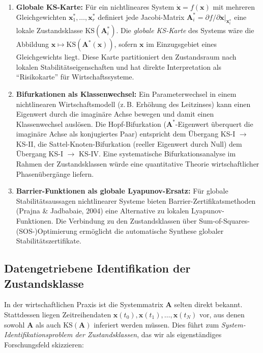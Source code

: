 \documentclass[a4paper, 12pt, twoside, openright]{report}
\theoremstyle{definition}
\theoremstyle{definition}
\newcommand{\vx}{\bm{x}}
\newcommand{\vA}{\bm{A}}
\newcommand{\KS}{\mathrm{KS}}
\begin{document}
\begin{enumerate}[label=\textbf{A\arabic*.}]
  \item \textbf{Globale KS-Karte:} Für ein nichtlineares System $\dot{\vx} = f(\vx)$
    mit mehreren Gleichgewichten $\vx_1^*, \ldots, \vx_r^*$ definiert jede
    Jacobi-Matrix $\vA_i^* = \partial f/\partial\vx|_{\vx_i^*}$ eine lokale
    Zustandsklasse $\KS(\vA_i^*)$. Die \emph{globale KS-Karte} des Systems wäre
    die Abbildung $\vx \mapsto \KS(\vA^*(\vx))$, sofern $\vx$ im Einzugsgebiet
    eines Gleichgewichts liegt. Diese Karte partitioniert den Zustandsraum nach
    lokalen Stabilitätseigenschaften und hat direkte Interpretation als ``Risikokarte''
    für Wirtschaftssysteme.

  \item \textbf{Bifurkationen als Klassenwechsel:} Ein Parameterwechsel in einem
    nichtlinearen Wirtschaftsmodell (z.\,B. Erhöhung des Leitzinses) kann einen
    Eigenwert durch die imaginäre Achse bewegen und damit einen Klassenwechsel
    auslösen. Die Hopf-Bifurkation ($\vA^*$-Eigenwert überquert die imaginäre Achse
    als konjugiertes Paar) entspricht dem Übergang KS-I $\to$ KS-II, die
    Sattel-Knoten-Bifurkation (reeller Eigenwert durch Null) dem Übergang KS-I $\to$ KS-IV.
    Eine systematische Bifurkationsanalyse im Rahmen der Zustandsklassen würde eine
    quantitative Theorie wirtschaftlicher Phasenübergänge liefern.

  \item \textbf{Barrier-Funktionen als globale Lyapunov-Ersatz:} Für globale
    Stabilitätsaussagen nichtlinearer Systeme bieten Barrier-Zertifikatsmethoden
    (Prajna \& Jadbabaie, 2004) eine Alternative zu lokalen Lyapunov-Funktionen.
    Die Verbindung zu den Zustandsklassen über Sum-of-Squares-(SOS-)Optimierung
    ermöglicht die automatische Synthese globaler Stabilitätszertifikate.
\end{enumerate}

\subsection{Datengetriebene Identifikation der Zustandsklasse}
\label{subsec:datengetrieben}

In der wirtschaftlichen Praxis ist die Systemmatrix $\vA$ selten direkt bekannt.
Stattdessen liegen Zeitreihendaten $\vx(t_0), \vx(t_1), \ldots, \vx(t_N)$ vor,
aus denen sowohl $\vA$ als auch $\KS(\vA)$ inferiert werden müssen. Dies führt zum
\emph{System-Identifikationsproblem der Zustandsklassen}, das wir als
eigenständiges Forschungsfeld skizzieren:
\end{document}
